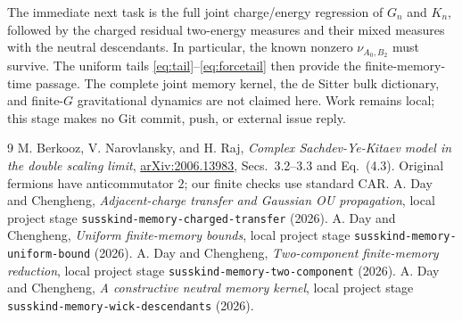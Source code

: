 \documentclass[11pt]{article}
\begin{document}
The immediate next task is the full joint charge/energy regression
of $G_n$ and $K_n$, followed by the charged residual two-energy
measures and their mixed measures with the neutral descendants.
In particular, the known nonzero $\nu_{A_0,B_2}$ must survive.
The uniform tails \eqref{eq:tail}--\eqref{eq:forcetail} then provide
the finite-memory-time passage. The complete joint memory kernel,
the de Sitter bulk dictionary, and finite-$G$ gravitational dynamics
are not claimed here. Work remains local; this stage makes no Git
commit, push, or external issue reply.

\begin{thebibliography}{9}
 M. Berkooz, V. Narovlansky, and H. Raj,
\emph{Complex Sachdev-Ye-Kitaev model in the double scaling limit},
\href{https://arxiv.org/abs/2006.13983}{arXiv:2006.13983},
Secs.~3.2--3.3 and Eq.~(4.3). Original fermions have anticommutator
$2$; our finite checks use standard CAR.
 A. Day and Chengheng,
\emph{Adjacent-charge transfer and Gaussian OU propagation},
local project stage \texttt{susskind-memory-charged-transfer} (2026).
 A. Day and Chengheng,
\emph{Uniform finite-memory bounds}, local project stage
\texttt{susskind-memory-uniform-bound} (2026).
 A. Day and Chengheng,
\emph{Two-component finite-memory reduction}, local project stage
\texttt{susskind-memory-two-component} (2026).
 A. Day and Chengheng,
\emph{A constructive neutral memory kernel}, local project stage
\texttt{susskind-memory-wick-descendants} (2026).
\end{thebibliography}
\end{document}
